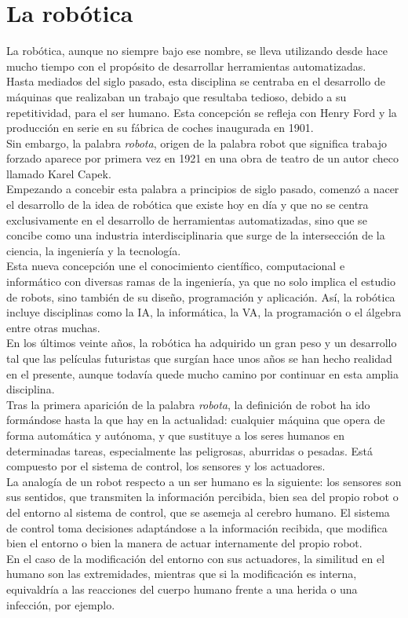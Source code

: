 \section{La robótica}
\label{sec:robotica}
La robótica, aunque no siempre bajo ese nombre, se lleva utilizando desde hace mucho tiempo con el propósito de desarrollar herramientas automatizadas.\\
Hasta mediados del siglo pasado, esta disciplina se centraba en el desarrollo de máquinas que realizaban un trabajo que resultaba tedioso, debido a su repetitividad, para el ser humano. Esta concepción se refleja con Henry Ford y la producción en serie en su fábrica de coches inaugurada en 1901.\\

Sin embargo, la palabra \textit{robota}, origen de la palabra robot que significa trabajo forzado aparece por primera vez en 1921 en una obra de teatro de un autor checo llamado Karel Capek.\\
Empezando a concebir esta palabra a principios de siglo pasado, comenzó a nacer el desarrollo de la idea de robótica que existe hoy en día y que no se centra exclusivamente en el desarrollo de herramientas automatizadas, sino que se concibe como una industria interdisciplinaria que surge de la intersección de la ciencia, la ingeniería y la tecnología.\\
Esta nueva concepción une el conocimiento científico, computacional e informático con diversas ramas de la ingeniería, ya que no solo implica el estudio de robots, sino también de su diseño, programación y aplicación. Así, la robótica incluye disciplinas como la IA, la informática, la VA, la programación o el álgebra entre otras muchas.\\

En los últimos veinte años, la robótica ha adquirido un gran peso y un desarrollo tal que las películas futuristas que surgían hace unos años se han hecho realidad en el presente, aunque todavía quede mucho camino por continuar en esta amplia disciplina.\\

Tras la primera aparición de la palabra \textit{robota}, la definición de robot ha ido formándose hasta la que hay en la actualidad:  cualquier máquina que opera de forma automática y autónoma, y que sustituye a los seres humanos en determinadas tareas, especialmente las peligrosas, aburridas o pesadas. Está compuesto por el sistema de control, los sensores y los actuadores.\\
La analogía de un robot respecto a un ser humano es la siguiente: los sensores son sus sentidos, que transmiten la información percibida, bien sea del propio robot o del entorno al sistema de control, que se asemeja al cerebro humano. El sistema de control toma decisiones adaptándose a la información recibida, que modifica bien el entorno o bien la manera de actuar internamente del propio robot. \\
En el caso de la modificación del entorno con sus actuadores, la similitud en el humano son las extremidades, mientras que si la modificación es interna, equivaldría a las reacciones del cuerpo humano frente a una herida o una infección, por ejemplo.\\

